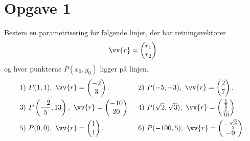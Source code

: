 \section*{Opgave 1}
Bestem en parametrisering for følgende linjer, der har retningsvektorer $$\vv{r} = \begin{pmatrix}
r_1 \\ r_2
\end{pmatrix}$$ og hvor punkterne $P(x_0,y_0)$ ligger på linjen.
\begin{align*}
&1) \ P(1,1), \ \vv{r} = \begin{pmatrix}
-2 \\ 3
\end{pmatrix}.   &&2) \ P(-5,-3), \ \vv{r} = \begin{pmatrix}
2 \\ 7
\end{pmatrix}.    \\
&3) \ P\left(\frac{-2}{5},13\right), \ \vv{r} = \begin{pmatrix}
-10 \\ 20
\end{pmatrix}.   &&4) \ P(\sqrt{2},\sqrt{3}), \ \vv{r} = \begin{pmatrix}
\frac{1}{5} \\ \frac{7}{10}
\end{pmatrix}.   \\
&5) \ P(0,0), \ \vv{r} = \begin{pmatrix}
1 \\ 1
\end{pmatrix}.   &&6) \ P(-100,5), \ \vv{r} = \begin{pmatrix}
-\frac{\sqrt{2}}{2} \\ -9
\end{pmatrix}.   \\
\end{align*}

